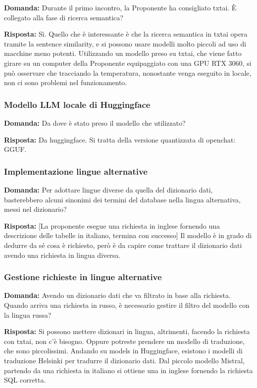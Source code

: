 \textbf{Domanda:} Durante il primo incontro, la Proponente ha consigliato txtai. È collegato alla fase di ricerca semantica?

\textbf{Risposta:} Sì. Quello che è interessante è che la ricerca semantica in txtai opera tramite la sentence similarity, e si possono usare modelli molto piccoli ad uso di macchine meno potenti.
Utilizzando un modello preso su txtai, che viene fatto girare su un computer della Proponente equipaggiato con una GPU RTX 3060, si può osservare che tracciando la temperatura, nonostante venga eseguito in locale, non ci sono problemi nel funzionamento.


\subsubsection{Modello LLM locale di Huggingface}

\textbf{Domanda:} Da dove è stato preso il modello che utilizzato?

\textbf{Risposta:} Da huggingface. Si tratta della versione quantizzata di openchat: GGUF.

\subsubsection{Implementazione lingue alternative}

\textbf{Domanda:} Per adottare lingue diverse da quella del dizionario dati, basterebbero alcuni sinonimi dei termini del database nella lingua alternativa, messi nel dizionario?

\textbf{Risposta:} [La proponente esegue una richiesta in inglese fornendo una descrizione delle tabelle in italiano, termina con successo]
Il modello è in grado di dedurre da sé cosa è richiesto, però è da capire come trattare il dizionario dati avendo una richiesta in lingua diversa.

\subsubsection{Gestione richieste in lingue alternative}

\textbf{Domanda:} Avendo un dizionario dati che va filtrato in base alla richiesta. Quando arriva una richiesta in russo, è necessario gestire il filtro del modello con la lingua russa?

\textbf{Risposta:} Si possono mettere dizionari in lingua, altrimenti, facendo la richiesta con txtai, non c'è bisogno. Oppure potreste prendere un modello di traduzione, che sono piccolissimi. Andando su models in Huggingface, esistono i modelli di traduzione Helsinki per tradurre il dizionario dati.
Dal piccolo modello Mistral, partendo da una richiesta in italiano si ottiene una in inglese fornendo la richiesta SQL corretta.

